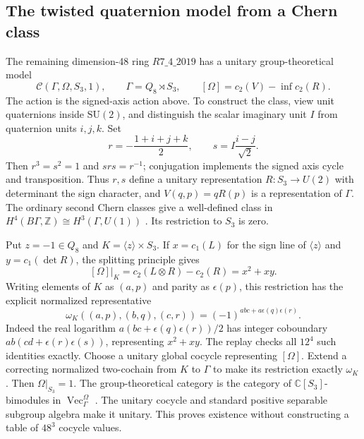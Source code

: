 \documentclass[11pt]{article}
\newcommand{\C}{\mathbb C}
\newcommand{\Z}{\mathbb Z}
\begin{document}
\subsection{The twisted quaternion model from a Chern class}
\label{sec:chern}
The remaining dimension-48 ring $R7\_4\_2019$ has a unitary
group-theoretical model
\[
 \mathcal C(\Gamma,\Omega,S_3,1),\qquad
 \Gamma=Q_8\rtimes S_3,\qquad
 [\Omega]=c_2(V)-\operatorname{inf}c_2(R).
\]
The action is the signed-axis action above. To construct the class,
view unit quaternions inside $\mathrm{SU}(2)$, and distinguish the
scalar imaginary unit $I$ from quaternion units $i,j,k$. Set
\[
 r=-\frac{1+i+j+k}{2},\qquad s=I\frac{i-j}{\sqrt2}.
\]
Then $r^3=s^2=1$ and $srs=r^{-1}$; conjugation implements the signed
axis cycle and transposition. Thus $r,s$ define a unitary
representation $R:S_3\to U(2)$ with determinant the sign character,
and $V(q,p)=qR(p)$ is a representation of $\Gamma$.
The ordinary second Chern classes give a well-defined class
in $H^4(B\Gamma,\Z)\cong H^3(\Gamma,U(1))$
\cite{Atiyah}. Its restriction to $S_3$ is zero.

Put $z=-1\in Q_8$ and $K=\langle z\rangle\times S_3$. If
$x=c_1(L)$ for the sign line of $\langle z\rangle$ and
$y=c_1(\det R)$, the splitting principle gives
\[
 [\Omega]|_K=c_2(L\otimes R)-c_2(R)=x^2+xy.
\]
Writing elements of $K$ as $(a,p)$ and parity as $\epsilon(p)$, this
restriction has the explicit normalized representative
\[
 \omega_K((a,p),(b,q),(c,r))=(-1)^{abc+a\epsilon(q)\epsilon(r)}.
\]
Indeed the real logarithm $a(bc+\epsilon(q)\epsilon(r))/2$ has
integer coboundary $ab(cd+\epsilon(r)\epsilon(s))$, representing
$x^2+xy$. The replay checks all $12^4$ such identities exactly.
Choose a unitary global cocycle representing $[\Omega]$. Extend a
correcting normalized two-cochain from $K$ to $\Gamma$ to make its
restriction exactly $\omega_K$. Then $\Omega|_{S_3}=1$.
The group-theoretical category is the category of $\C[S_3]$-bimodules
in $\operatorname{Vec}_{\Gamma}^{\Omega}$
\cite[Section~3 and Theorem~5.1]{GelakiNaidu}. The unitary cocycle and
standard positive separable subgroup algebra make it unitary.
This proves existence without constructing a table of $48^3$ cocycle values.
\end{document}
